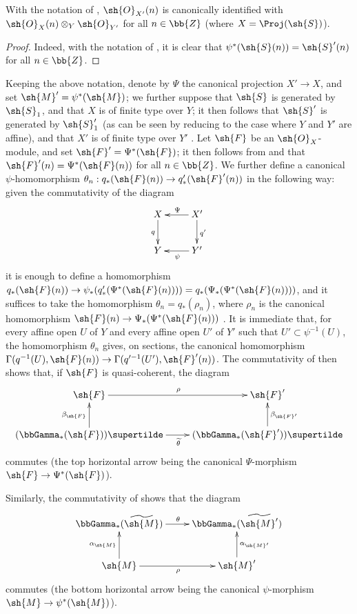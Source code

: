 \begin{corollary}[3.5.4]
\label{II.3.5.4}
With the notation of , $\sh{O}_{X'}(n)$ is canonically identified with $\sh{O}_X(n)\otimes_Y\sh{O}_{Y'}$ for all $n\in\bb{Z}$ (where $X=\Proj(\sh{S})$).
\end{corollary}

\begin{proof}
Indeed, with the notation of , it is clear that $\psi^*(\sh{S}(n))=\sh{S}'(n)$ for all $n\in\bb{Z}$.
\end{proof}

\begin{env}[3.5.5]
\label{II.3.5.5}
Keeping the above notation, denote by $\Psi$ the canonical projection $X'\to X$, and set $\sh{M}'=\psi^*(\sh{M})$;
we further suppose that $\sh{S}$ is generated by $\sh{S}_1$, and that $X$ is of finite type over $Y$;
it then follows that $\sh{S}'$ is generated by $\sh{S}'_1$ (as can be seen by reducing to the case where $Y$ and $Y'$ are affine), and that $X'$ is of finite type over $Y'$ .
Let $\sh{F}$ be an $\sh{O}_X$-module, and set $\sh{F}'=\Psi^*(\sh{F})$;
it then follows from  and  that $\sh{F}'(n)=\Psi^*(\sh{F}(n))$ for all $n\in\bb{Z}$.
We further define a canonical $\psi$-homomorphism $\theta_n:q_*(\sh{F}(n))\to q'_*(\sh{F}'(n))$ in the following way: given the commutativity of the diagram
\[
  \xymatrix{
    X \ar[d]_{q}
    & X' \ar[l]_{\Psi} \ar[d]^{q'}
  \\Y
    & Y' \ar[l]^{\psi}
  }
\]
it is enough to define a homomorphism $q_*(\sh{F}(n))\to\psi_*(q'_*(\Psi^*(\sh{F}(n))))=q_*(\Psi_*(\Psi^*(\sh{F}(n))))$, and it suffices to take the homomorphism $\theta_n=q_*(\rho_n)$, where $\rho_n$ is the canonical homomorphism $\sh{F}(n)\to\Psi_*(\Psi^*(\sh{F}(n)))$ .
It is immediate that, for every affine open $U$ of $Y$ and every affine open $U'$ of $Y'$ such that $U'\subset\psi^{-1}(U)$, the homomorphism $\theta_n$ gives, on sections, the canonical homomorphism  $\Gamma(q^{-1}(U),\sh{F}(n))\to\Gamma(q'^{-1}(U'),\sh{F}'(n))$.
The commutativity of  then shows that, if $\sh{F}$ is quasi-coherent, the diagram
\[
  \xymatrix{
    \sh{F} \ar[r]^{\rho}
    & \sh{F}'
  \\(\bbGamma_*(\sh{F}))\supertilde \ar[u]^{\beta_{\sh{F}}} \ar[r]_{\widetilde{\theta}}
    & (\bbGamma_*(\sh{F}'))\supertilde \ar[u]_{\beta_{\sh{F}'}}
  }
\]
commutes (the top horizontal arrow being the canonical $\Psi$-morphism $\sh{F}\to\Psi^*(\sh{F})$).

Similarly, the commutativity of  shows that the diagram
\[
  \xymatrix{
    \bbGamma_*(\widetilde{\sh{M}}) \ar[r]^{\theta}
    & \bbGamma_*(\widetilde{\sh{M}'})
  \\\sh{M} \ar[r]_{\rho} \ar[u]^{\alpha_{\sh{M}}}
    & \sh{M}' \ar[u]_{\alpha_{\sh{M}'}}
  }
\]
commutes (the bottom horizontal arrow being the canonical $\psi$-morphism $\sh{M}\to\psi^*(\sh{M})$).
\end{env}

